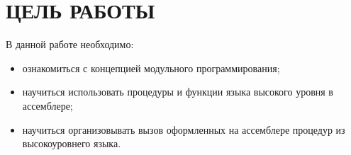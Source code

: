\section{ЦЕЛЬ РАБОТЫ}

В данной работе необходимо:

\begin{itemize}

  \item ознакомиться с концепцией модульного программирования;

  \item научиться использовать процедуры и функции языка высокого
    уровня в ассемблере;

  \item научиться организовывать вызов оформленных на ассемблере процедур
    из высокоуровнего языка.

\end{itemize}

\pagebreak
